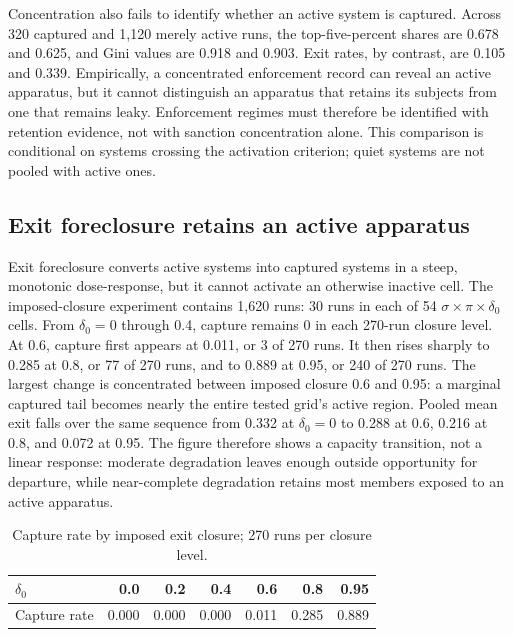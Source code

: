 \documentclass[12pt]{article}
\begin{document}
Concentration also fails to identify whether an active system is captured. Across 320 captured
and 1,120 merely active runs, the top-five-percent shares are 0.678 and 0.625, and Gini values
are 0.918 and 0.903. Exit rates, by contrast, are 0.105 and 0.339. Empirically, a concentrated
enforcement record can reveal an active apparatus, but it cannot distinguish an apparatus that
retains its subjects from one that remains leaky. Enforcement regimes must therefore be
identified with retention evidence, not with sanction concentration alone. This comparison is
conditional on systems crossing the activation criterion; quiet systems are not pooled with
active ones.

\subsection{Exit foreclosure retains an active apparatus}

Exit foreclosure converts active systems into captured systems in a steep, monotonic
dose-response, but it cannot activate an otherwise inactive cell. The imposed-closure experiment
contains 1,620 runs: 30 runs in each of 54 \(\sigma \times \pi \times \delta_0\) cells. From
\(\delta_0=0\) through 0.4, capture remains 0 in each 270-run closure level. At 0.6, capture
first appears at 0.011, or 3 of 270 runs. It then rises sharply to 0.285 at 0.8, or 77 of 270
runs, and to 0.889 at 0.95, or 240 of 270 runs. The largest change is concentrated between
imposed closure 0.6 and 0.95: a marginal captured tail becomes nearly the entire tested grid's
active region. Pooled mean exit falls over the same sequence from 0.332 at \(\delta_0=0\) to
0.288 at 0.6, 0.216 at 0.8, and 0.072 at 0.95. The figure therefore shows a capacity transition,
not a linear response: moderate degradation leaves enough outside opportunity for departure,
while near-complete degradation retains most members exposed to an active apparatus.

\begin{table}[htbp]
\centering
\caption{Capture rate by imposed exit closure; 270 runs per closure level.}
\label{tab:dose-response}
\begin{tabular}{lrrrrrr}
\hline
$\delta_0$ & 0.0 & 0.2 & 0.4 & 0.6 & 0.8 & 0.95 \\
\hline
Capture rate & 0.000 & 0.000 & 0.000 & 0.011 & 0.285 & 0.889 \\
\hline
\end{tabular}
\end{table}
\end{document}
